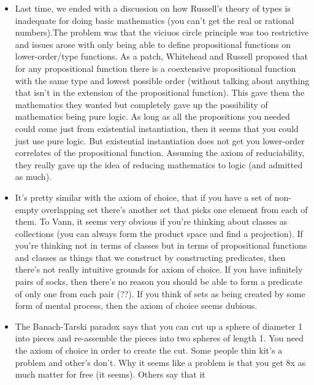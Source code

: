 \documentclass[12pt]{article}
\theoremstyle{definition}
\begin{document}
\begin{itemize}
    \itemsep0em 
    \item 
        Last time, we ended with a discussion on how Russell's theory of types
        is inadequate for doing basic mathematics (you can't get the real or
        rational numbers).The problem was that the viciuos circle principle was
        too restrictive and issues arose with only being able to define
        propositional functions on lower-order/type functions. As a patch,
        Whitehead and Russell proposed that for any propositional function
        there is a coextensive propositional function with the same type and
        lowest possible order (without talking about anything that isn't in the
        extension of the propositional function). This gave them the
        mathematics they wanted but completely gave up the possibility of
        mathematics being pure logic. As long as all the propositions you
        needed could come just from existential instantiation, then it seems
        that you could just use pure logic. But existential instantiation does
        not get you lower-order correlates of the propositional function.
        Assuming the axiom of reduciability, they really gave up the idea of
        reducing mathematics to logic (and admitted as much).
    \item
       It's pretty similar with the axiom of choice, that if you have a set of
       non-empty overlapping set there's another set that picks one element
       from each of them. To Vann, it seems very obvious if you're thinking
       about classes as collections (you can always form the product space and
       find a projection). If you're thinking not in terms of classes but in
       terms of propositional functions and classes as things that we construct
       by constructing predicates, then there's not really intuitive grounds
       for axiom of choice. If you have infinitely pairs of socks, then there's
       no reason you should be able to form a predicate of only one from each
       pair (??). If you think of sets as being created by some form of mental
       process, then the axiom of choice seems dubious.
    \item
        The Banach-Tarski paradox says that you can cut up a sphere of diameter
        1 into pieces and re-assemble the pieces into two spheres of length 1.
        You need the axiom of choice in order to create the cut. Some people
        thin kit's a problem and other's don't. Why it seems like a problem is
        that you get 8x as much matter for free (it seems). Others say that it

\end{itemize}
\end{document}
